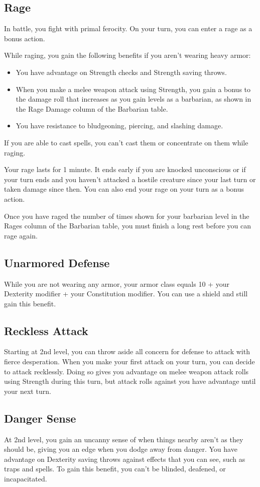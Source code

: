 {\subsection*{Rage}
In battle, you fight with primal ferocity. On your turn, you can enter a rage as a bonus action.

While raging, you gain the following benefits if you aren't wearing heavy armor:

\begin{itemize}
	\item You have advantage on Strength checks and Strength saving throws.
	\item When you make a melee weapon attack using Strength, you gain a bonus to the damage roll that increases as you gain levels as a barbarian, as shown in the Rage Damage column of the Barbarian table.
	\item You have resistance to bludgeoning, piercing, and slashing damage.
\end{itemize}
If you are able to cast spells, you can't cast them or concentrate on them while raging.

Your rage lasts for 1 minute. It ends early if you are knocked unconscious or if your turn ends and you haven't attacked a hostile creature since your last turn or taken damage since then. You can also end your rage on your turn as a bonus action.

Once you have raged the number of times shown for your barbarian level in the Rages column of the Barbarian table, you must finish a long rest before you can rage again.
\subsection*{Unarmored Defense}
While you are not wearing any armor, your armor class equals 10 + your Dexterity modifier + your Constitution modifier. You can use a shield and still gain this benefit.
\subsection*{Reckless Attack}
Starting at 2nd level, you can throw aside all concern for defense to attack with fierce desperation. When you make your first attack on your turn, you can decide to attack recklessly. Doing so gives you advantage on melee weapon attack rolls using Strength during this turn, but attack rolls against you have advantage until your next turn.
\subsection*{Danger Sense}
At 2nd level, you gain an uncanny sense of when things nearby aren't as they should be, giving you an edge when you dodge away from danger. You have advantage on Dexterity saving throws against effects that you can see, such as traps and spells. To gain this benefit, you can't be blinded, deafened, or incapacitated.
}
